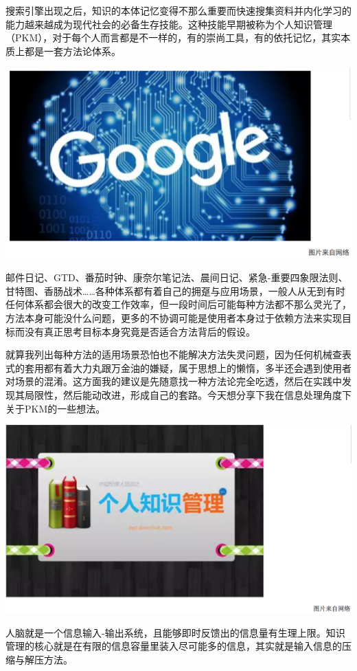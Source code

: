\documentclass[]{book}
\begin{document}
搜索引擎出现之后，知识的本体记忆变得不那么重要而快速搜集资料并内化学习的能力越来越成为现代社会的必备生存技能。这种技能早期被称为个人知识管理（PKM），对于每个人而言都是不一样的，有的崇尚工具，有的依托记忆，其实本质上都是一套方法论体系。

\includegraphics[width=8.33in]{images/gtd1}

邮件日记、GTD、番茄时钟、康奈尔笔记法、晨间日记、紧急-重要四象限法则、甘特图、香肠战术\ldots{}\ldots{}各种体系都有着自己的拥趸与应用场景，一般人从无到有时任何体系都会很大的改变工作效率，但一段时间后可能每种方法都不那么灵光了，方法本身可能没什么问题，更多的不协调可能是使用者本身过于依赖方法来实现目标而没有真正思考目标本身究竟是否适合方法背后的假设。

就算我列出每种方法的适用场景恐怕也不能解决方法失灵问题，因为任何机械查表式的套用都有着大力丸跟万金油的嫌疑，属于思想上的懒惰，多半还会遇到使用者对场景的混淆。这方面我的建议是先随意找一种方法论完全吃透，然后在实践中发现其局限性，然后能动改进，形成自己的套路。今天想分享下我在信息处理角度下关于PKM的一些想法。

\includegraphics[width=8.33in]{images/gtd2}

人脑就是一个信息输入-输出系统，且能够即时反馈出的信息量有生理上限。知识管理的核心就是在有限的信息容量里装入尽可能多的信息，其实就是输入信息的压缩与解压方法。
\end{document}
